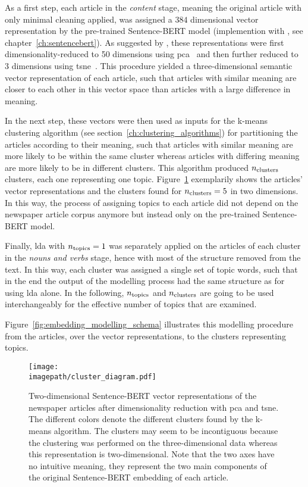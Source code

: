As a first step, each article in the \textit{content} stage, meaning the original article with only minimal cleaning applied, was assigned a $384$ dimensional vector representation by the pre-trained Sentence-BERT model (implemention with \textcite{sbertsentencetransformers_sentencetransformers_nodate}, see chapter~\ref{ch:sentencebert}). As suggested by \textcite{black_using_2020}, these representations were first dimensionality-reduced to \SI{50}{} dimensions using \gls{pca}~\autocite{pearson_liii_1901} and then further reduced to \SI{3}{} dimensions using \gls{tsne}~\autocite{maaten_visualizing_2008}. This procedure yielded a three-dimensional semantic vector representation of each article, such that articles with similar meaning are closer to each other in this vector space than articles with a large difference in meaning.

In the next step, these vectors were then used as inputs for the k-means clustering algorithm (see section~\ref{ch:clustering_algorithms}) for partitioning the articles according to their meaning, such that articles with similar meaning are more likely to be within the same cluster whereas articles with differing meaning are more likely to be in different clusters. This algorithm produced $n_\text{clusters}$ clusters, each one representing one topic. Figure~\ref{fig:clusters} exemplarily shows the articles' vector representations and the clusters found for $n_\text{clusters}=5$ in two dimensions. In this way, the process of assigning topics to each article did not depend on the newspaper article corpus anymore but instead only on the pre-trained Sentence-BERT model.

Finally, \gls{lda} with $n_\text{topics}=1$ was separately applied on the articles of each cluster in the \textit{nouns and verbs} stage, hence with most of the structure removed from the text. In this way, each cluster was assigned a single set of topic words, such that in the end the output of the modelling process had the same structure as for using \gls{lda} alone. In the following, $n_\text{topics}$ and $n_\text{clusters}$ are going to be used interchangeably for the effective number of topics that are examined.

Figure~\ref{fig:embedding_modelling_schema} illustrates this modelling procedure from the articles, over the vector representations, to the clusters representing topics.

\begin{figure}
    \centering
    \texttt{[image: \\imagepath/cluster\_diagram.pdf]}
    \caption{Two-dimensional Sentence-BERT vector representations of the newspaper articles after dimensionality reduction with \gls{pca} and \gls{tsne}. The different colors denote the different clusters found by the k-means algorithm. The clusters may seem to be incontiguous because the clustering was performed on the three-dimensional data whereas this representation is two-dimensional. Note that the two axes have no intuitive meaning, they represent the two main components of the original Sentence-BERT embedding of each article.}\label{fig:clusters}
\end{figure}

